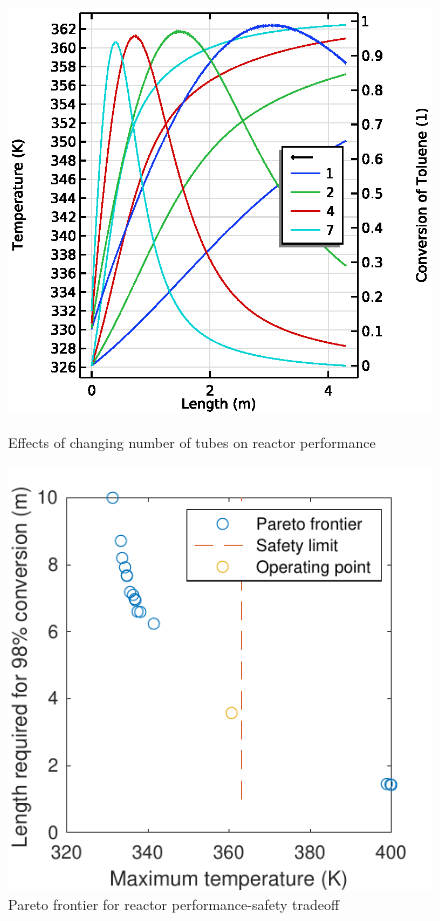 \begin{figure}[h]
    \centering
    \begin{minipage}[t]{0.45\linewidth}
        \includegraphics[width=\linewidth]{figures/S5-T-X.eps}
        \caption{Effects of changing number of tubes on reactor performance}
        \label{fig:S5-T-X}
    \end{minipage}\hfill
    \begin{minipage}[t]{0.45\linewidth}
        \includegraphics{figures/comsol-pareto.pdf}
        \caption{Pareto frontier for reactor performance-safety tradeoff}
        \label{fig:comsol-pareto}
    \end{minipage}
\end{figure}

